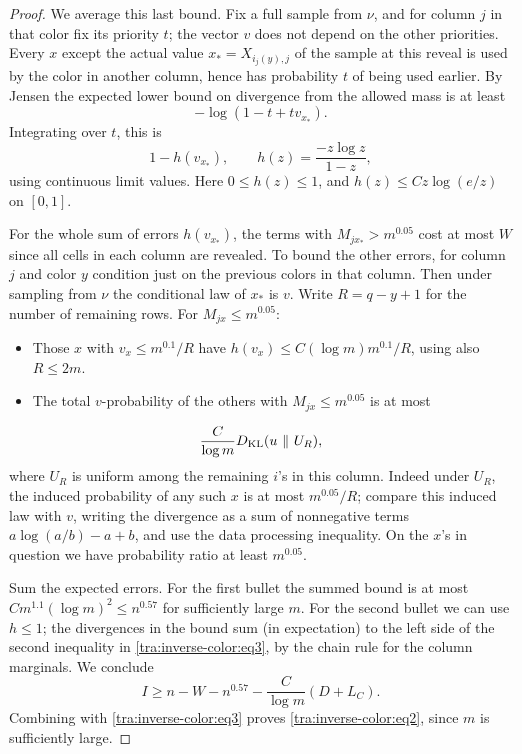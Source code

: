 \begin{proof}
We average this last bound. Fix a full sample from \(\nu\), and for column \(j\) in that color fix its priority \(t\); the vector \(v\) does not depend on the other priorities. Every \(x\) except the actual value \(x_* = X_{i_j(y),j}\) of the sample at this reveal is used by the color in another column, hence has probability \(t\) of being used earlier. By Jensen the expected lower bound on divergence from the allowed mass is at least
\[
                              -\log(1-t+t v_{x_*}).
\]
Integrating over \(t\), this is
\[
                 1-h(v_{x_*}),\qquad h(z)=\frac{-z\log z}{1-z},
\]
using continuous limit values. Here \(0\le h(z)\le 1\), and \(h(z)\le C z\log(e/z)\) on \([0,1]\).

For the whole sum of errors \(h(v_{x_*})\), the terms with \(M_{j x_*}>m^{0.05}\) cost at most \(W\) since all cells in each column are revealed. To bound the other errors, for column \(j\) and color \(y\) condition just on the previous colors in that column. Then under sampling from \(\nu\) the conditional law of \(x_*\) is \(v\). Write \(R=q-y+1\) for the number of remaining rows. For \(M_{jx}\le m^{0.05}\):
\begin{itemize}
\item Those \(x\) with \(v_x\le m^{0.1}/R\) have \(h(v_x)\le C(\log m)m^{0.1}/R\), using also \(R\le 2m\).
\item The total \(v\)-probability of the others with \(M_{jx}\le m^{0.05}\) is at most
\end{itemize}
\[
                          \frac{C}{\log m}D_{\rm KL}(u\ \|\ U_R),
\]
where \(U_R\) is uniform among the remaining \(i\)'s in this column. Indeed under \(U_R\), the induced probability of any such \(x\) is at most \(m^{0.05}/R\); compare this induced law with \(v\), writing the divergence as a sum of nonnegative terms \(a\log(a/b)-a+b\), and use the data processing inequality. On the \(x\)'s in question we have probability ratio at least \(m^{0.05}\).

Sum the expected errors. For the first bullet the summed bound is at most \(C m^{1.1}(\log m)^2\le n^{0.57}\) for sufficiently large \(m\). For the second bullet we can use \(h\le1\); the divergences in the bound sum (in expectation) to the left side of the second inequality in \eqref{tra:inverse-color:eq3}, by the chain rule for the column marginals. We conclude
\[
                 I\ge n-W-n^{0.57}-\frac{C}{\log m}(D+L_C).
\]
Combining with \eqref{tra:inverse-color:eq3} proves \eqref{tra:inverse-color:eq2}, since \(m\) is sufficiently large.


\end{proof}

